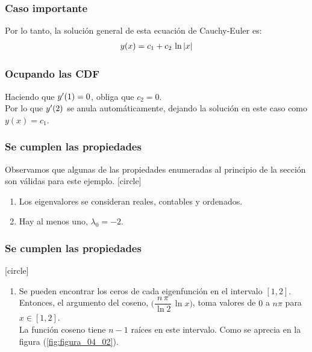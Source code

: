 \documentclass[12pt]{beamer}
\begin{document}
\begin{frame}
\frametitle{Caso importante}
Por lo tanto, la solución general de esta ecuación de Cauchy-Euler es:
\pause
\begin{align*}
y (x) = c_{1} + c_{2} \, \ln \abs{x}
\end{align*}
\end{frame}
\begin{frame}
\frametitle{Ocupando las CDF}
Haciendo que ${y}^{\prime} (1) = 0$, obliga que $c_{2} = 0$.
\\
\bigskip
\pause
Por lo que ${y}^{\prime} (2)$ se anula automáticamente, dejando la solución en este caso como $y(x) = c_{1}$.
\end{frame}
\begin{frame}
\frametitle{Se cumplen las propiedades}
Observamos que algunas de las propiedades enumeradas al principio de la sección son válidas para este ejemplo.
\pause
{}
[circle]
\begin{enumerate}[<+->]
\item Los eigenvalores se consideran reales, contables y ordenados.
\item Hay al menos uno, $\lambda_{0} = -2$.
\seti
\end{enumerate}
\end{frame}
\begin{frame}
\frametitle{Se cumplen las propiedades}
[circle]
\begin{enumerate}[<+->]
\conti
\item Se pueden encontrar los ceros de cada eigenfunción en el intervalo $[1, 2]$. \pause Entonces, el argumento del coseno, $\bigg( \dfrac{n \, \pi}{\ln 2} \, \ln x \bigg)$, toma valores de $0$ a $n \pi$ para $x \in [1, 2]$. 
\\
\bigskip
\pause
La función coseno tiene $n - 1$ raíces en este intervalo. Como se aprecia en la figura (\ref{fig:figura_04_02}).
\seti
\end{enumerate}
\end{frame}
\end{document}
